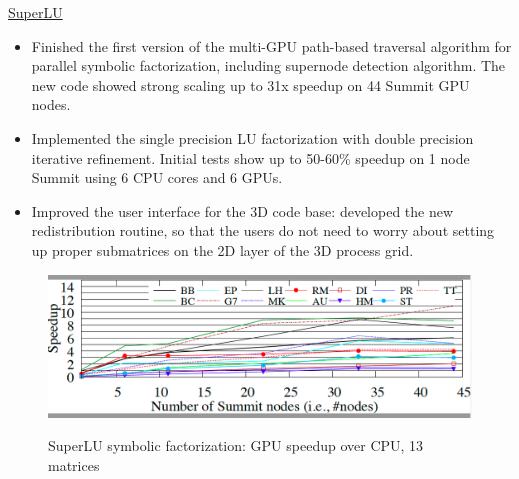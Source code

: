\underline{SuperLU}
\begin{itemize}
\item Finished the first version of the multi-GPU path-based traversal algorithm for
  parallel symbolic factorization, including supernode detection algorithm. The new code
  showed strong scaling up to 31x speedup on 44 Summit GPU nodes.
\item Implemented the single precision LU factorization with double precision iterative refinement.
  Initial tests show up to 50-60\% speedup on 1 node Summit using 6 CPU cores and 6 GPUs.
\item Improved the user interface for the 3D code base: developed the new redistribution routine,
  so that the users do not need to worry about setting up proper submatrices on the 2D layer
  of the 3D process grid.
\end{itemize}

\vspace{-.13in}
\begin{figure}[htb]
\centering
\includegraphics[scale=0.2]{projects/2.3.3-MathLibs/2.3.3.07-STRUMPACK-SuperLU/speedup_SOA.jpg}
\label{fig:strumpack-metis-scaling}
\caption{SuperLU symbolic factorization: GPU speedup over CPU, 13 matrices}
\end{figure}


